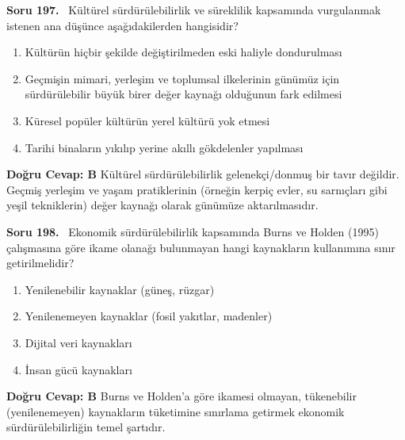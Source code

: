 \documentclass[11pt,a4paper,openany]{book}
\begin{document}
\needspace{5cm}
\vspace{8pt}
\noindent\textbf{\large\sffamily Soru 197.} \ Kültürel sürdürülebilirlik ve süreklilik kapsamında vurgulanmak istenen ana düşünce aşağıdakilerden hangisidir?
\begin{enumerate}[label=\Alph*), leftmargin=25pt, topsep=4pt, itemsep=2pt]
    \item Kültürün hiçbir şekilde değiştirilmeden eski haliyle dondurulması
    \item Geçmişin mimari, yerleşim ve toplumsal ilkelerinin günümüz için sürdürülebilir büyük birer değer kaynağı olduğunun fark edilmesi
    \item Küresel popüler kültürün yerel kültürü yok etmesi
    \item Tarihi binaların yıkılıp yerine akıllı gökdelenler yapılması
\end{enumerate}
\vspace{4pt}
\begin{tcolorbox}[title=Cevap ve Açıklama, colback=gray!3!white, colframe=primarycolor!90!black, arc=2mm, fonttitle=\bfseries\sffamily, top=6pt, bottom=6pt]
    \textbf{Doğru Cevap: B}
    \vspace{2pt}
    Kültürel sürdürülebilirlik gelenekçi/donmuş bir tavır değildir. Geçmiş yerleşim ve yaşam pratiklerinin (örneğin kerpiç evler, su sarnıçları gibi yeşil tekniklerin) değer kaynağı olarak günümüze aktarılmasıdır.
\end{tcolorbox}
\vspace{10pt}

\needspace{5cm}
\vspace{8pt}
\noindent\textbf{\large\sffamily Soru 198.} \ Ekonomik sürdürülebilirlik kapsamında Burns ve Holden (1995) çalışmasına göre ikame olanağı bulunmayan hangi kaynakların kullanımına sınır getirilmelidir?
\begin{enumerate}[label=\Alph*), leftmargin=25pt, topsep=4pt, itemsep=2pt]
    \item Yenilenebilir kaynaklar (güneş, rüzgar)
    \item Yenilenemeyen kaynaklar (fosil yakıtlar, madenler)
    \item Dijital veri kaynakları
    \item İnsan gücü kaynakları
\end{enumerate}
\vspace{4pt}
\begin{tcolorbox}[title=Cevap ve Açıklama, colback=gray!3!white, colframe=primarycolor!90!black, arc=2mm, fonttitle=\bfseries\sffamily, top=6pt, bottom=6pt]
    \textbf{Doğru Cevap: B}
    \vspace{2pt}
    Burns ve Holden'a göre ikamesi olmayan, tükenebilir (yenilenemeyen) kaynakların tüketimine sınırlama getirmek ekonomik sürdürülebilirliğin temel şartıdır.
\end{tcolorbox}
\vspace{10pt}
\end{document}
